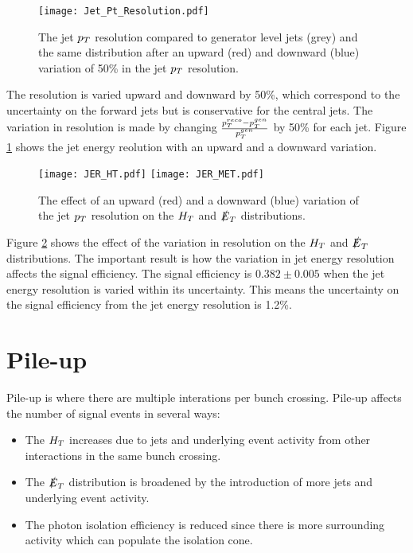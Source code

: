 \begin{figure}
\begin{center}
\texttt{[image: Jet\_Pt\_Resolution.pdf]}
\end{center}
\caption{The jet $p_{T}$ resolution compared to generator level jets (grey) and
the same distribution after an upward (red) and downward (blue) 
variation of 50\unit{\%} in the jet $p_{T}$ resolution.}
\label{fig:Resolution}
\end{figure}

The resolution is varied upward and downward by 50\unit{\%}, which correspond to 
the uncertainty on the forward jets but is conservative for the central jets. 
The variation in resolution is made by changing $\frac{p_{T}^{reco} -
p_{T}^{gen}}{p_{T}^{gen}}$ by 50\unit{\%} for each jet. Figure \ref{fig:Resolution}
shows the jet energy reolution with an upward and a downward variation. \\

\begin{figure}
\texttt{[image: JER\_HT.pdf]}
\texttt{[image: JER\_MET.pdf]}
\caption{The effect of an upward (red) and a downward (blue) variation
of the jet $p_{T}$ resolution on the $H_{T}$ and $\slashed{E}_{T}$ distributions.}
\label{fig:JER}
\end{figure}

Figure \ref{fig:JER} shows the effect of the variation in resolution on the
$H_{T}$ and $\slashed{E}_{T}$ distributions. The important result is how the variation in jet 
energy resolution affects the signal efficiency. The signal efficiency is 
$0.382\pm0.005$ when the jet energy resolution is varied within its uncertainty. 
This means the uncertainty on the signal efficiency from the jet energy
resolution is 1.2\unit{\%}.

\section{Pile-up}

Pile-up is where there are multiple interations per bunch crossing. Pile-up 
affects the number of signal events in several ways:

\begin{itemize}
\item The $H_{T}$ increases due to jets and underlying event activity from other 
interactions in the same bunch crossing.
\item The $\slashed{E}_{T}$ distribution is broadened by the introduction of more jets and
underlying event activity.
\item The photon isolation efficiency is reduced since there is more 
surrounding activity which can populate the isolation cone.
\end{itemize}

